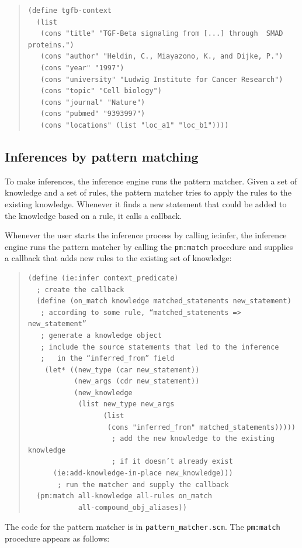 \documentclass[11pt]{article}
\begin{document}
\begin{quote}
\begin{verbatim}
(define tgfb-context
  (list
   (cons "title" "TGF-Beta signaling from [...] through  SMAD proteins.")
   (cons "author" "Heldin, C., Miayazono, K., and Dijke, P.")
   (cons "year" "1997")
   (cons "university" "Ludwig Institute for Cancer Research")
   (cons "topic" "Cell biology")
   (cons "journal" "Nature")
   (cons "pubmed" "9393997")
   (cons "locations" (list "loc_a1" "loc_b1"))))
\end{verbatim}
\end{quote}
\subsection{Inferences by pattern matching}
\label{sec-2-4}

To make inferences, the inference engine runs the pattern matcher. Given a set of knowledge and a set of rules, the pattern matcher tries to apply the rules to the existing knowledge. Whenever it finds a new statement that could be added to the knowledge based on a rule, it calls a callback.

Whenever the user starts the inference process by calling ie:infer, the inference engine runs the pattern matcher by calling the \texttt{pm:match} procedure and supplies a callback that adds new rules to the existing set of knowledge:

\begin{quote}
\begin{verbatim}
(define (ie:infer context_predicate)
  ; create the callback
  (define (on_match knowledge matched_statements new_statement)
   ; according to some rule, “matched_statements => new_statement”
   ; generate a knowledge object
   ; include the source statements that led to the inference
   ;   in the “inferred_from” field
    (let* ((new_type (car new_statement))
           (new_args (cdr new_statement))
           (new_knowledge
            (list new_type new_args
                  (list
                   (cons "inferred_from" matched_statements)))))
                    ; add the new knowledge to the existing knowledge
                    ; if it doesn’t already exist
      (ie:add-knowledge-in-place new_knowledge)))
       ; run the matcher and supply the callback
  (pm:match all-knowledge all-rules on_match
            all-compound_obj_aliases))
\end{verbatim}
\end{quote}

The code for the pattern matcher is in \texttt{pattern\_matcher.scm}. The \texttt{pm:match} procedure appears as follows:
\end{document}
